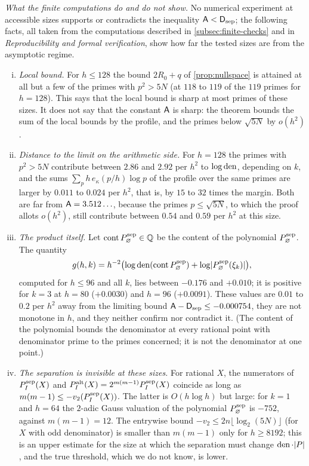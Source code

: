 \emph{What the finite computations do and do not show.} No numerical experiment at accessible
sizes supports or contradicts the inequality $\mathsf{A}<\mathsf{D}_{\mathrm{sep}}$; the following facts, all taken from
the computations described in \cref{subsec:finite-checks} and in \emph{Reproducibility and formal
verification}, show how far the tested sizes are from the asymptotic regime.
\begin{enumerate}[(i)]
  \item \emph{Local bound.} For $h\le128$ the bound $2R_0+q$ of \cref{prop:nullspace} is attained
  at all but a few of the primes with $p^2>5N$ (at $118$ to $119$ of the $119$ primes for $h=128$).
  This says that the local bound is sharp at most primes of these sizes. It does not say that the
  constant $\mathsf{A}$ is sharp: the theorem bounds the sum of the local bounds by the profile, and the
  primes below $\sqrt{5N}$ by $o(h^2)$.
  \item \emph{Distance to the limit on the arithmetic side.} For $h=128$ the primes with
  $p^2>5N$ contribute between $2.86$ and $2.92$ per $h^2$ to $\log\operatorname{den}$, depending on $k$, and
  the sums $\sum_p h\,e_\kappa(p/h)\log p$ of the profile over the same primes are larger by
  $0.011$ to $0.024$ per $h^2$, that is, by $15$ to $32$ times the margin. Both are far from
  $\mathsf{A}=3.512\ldots$, because the primes $p\le\sqrt{5N}$, to which the proof allots $o(h^2)$, still
  contribute between $0.54$ and $0.59$ per $h^2$ at this size.
  \item \emph{The product itself.} Let $\operatorname{cont}P^{\mathrm{sep}}_\varnothing\in\mathbb{Q}$ be the
  content of the polynomial $P^{\mathrm{sep}}_\varnothing$. The quantity
  \[
    g(h,k)=h^{-2}\bigl(\log\operatorname{den}(\operatorname{cont}P^{\mathrm{sep}}_\varnothing)
    +\log\lvert P^{\mathrm{sep}}_\varnothing(\xi_k)\rvert\bigr),
  \]
  computed for $h\le96$ and all $k$, lies between $-0.176$ and $+0.010$; it is positive for $k=3$
  at $h=80$ ($+0.0030$) and $h=96$ ($+0.0091$). \TRENDEXTRA{} These values are $0.01$ to $0.2$ per $h^2$ away from the
  limiting bound $\mathsf{A}-\mathsf{D}_{\mathrm{sep}}\le-0.000754$, they are not monotone in $h$, and they neither
  confirm nor contradict it. (The content of the polynomial bounds the denominator at every
  rational point with denominator prime to the primes concerned; it is not the denominator at one
  point.)
  \item \emph{The separation is invisible at these sizes.} For rational $X$, the numerators of
  $P^{\mathrm{sep}}_I(X)$ and $P^{\mathrm{alt}}_I(X)=2^{m(m-1)}P^{\mathrm{sep}}_I(X)$ coincide as long as
  $m(m-1)\le-v_2(P^{\mathrm{sep}}_I(X))$. The latter is $O(h\log h)$ but large: for $k=1$ and $h=64$ the
  $2$-adic Gauss valuation of the polynomial $P^{\mathrm{sep}}_\varnothing$ is $-752$, against
  $m(m-1)=12$. The entrywise bound $-v_2\le2n\lfloor\log_2(5N)\rfloor$ (for $X$ with odd
  denominator) is smaller than $m(m-1)$ only for $h\ge8192$; this is an upper estimate for the
  size at which the separation must change $\operatorname{den}\cdot\lvert P\rvert$, and the true threshold, which we
  do not know, is lower.
\end{enumerate}
